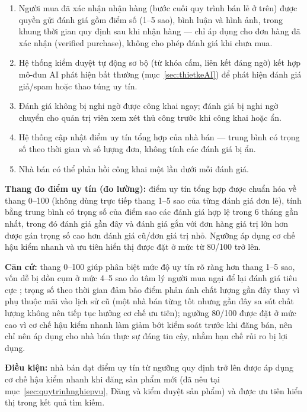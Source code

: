 \begin{enumerate}
    \item Người mua đã xác nhận nhận hàng (bước cuối quy trình bán lẻ ở trên) được quyền gửi đánh giá gồm điểm số (1--5 sao), bình luận và hình ảnh, trong khung thời gian quy định sau khi nhận hàng --- chỉ áp dụng cho đơn hàng đã xác nhận (verified purchase), không cho phép đánh giá khi chưa mua.
    \item Hệ thống kiểm duyệt tự động sơ bộ (từ khóa cấm, liên kết đáng ngờ) kết hợp mô-đun AI phát hiện bất thường (mục~\ref{sec:thietkeAI}) để phát hiện đánh giá giả/spam hoặc thao túng uy tín.
    \item Đánh giá không bị nghi ngờ được công khai ngay; đánh giá bị nghi ngờ chuyển cho quản trị viên xem xét thủ công trước khi công khai hoặc ẩn.
    \item Hệ thống cập nhật điểm uy tín tổng hợp của nhà bán --- trung bình có trọng số theo thời gian và số lượng đơn, không tính các đánh giá bị ẩn.
    \item Nhà bán có thể phản hồi công khai một lần dưới mỗi đánh giá.
\end{enumerate}

\textbf{Thang đo điểm uy tín (đo lường):} điểm uy tín tổng hợp được chuẩn hóa về thang 0--100 (không dùng trực tiếp thang 1--5 sao của từng đánh giá đơn lẻ), tính bằng trung bình có trọng số của điểm sao các đánh giá hợp lệ trong 6 tháng gần nhất, trong đó đánh giá gần đây và đánh giá gắn với đơn hàng giá trị lớn hơn được gán trọng số cao hơn đánh giá cũ/đơn giá trị nhỏ. Ngưỡng áp dụng cơ chế hậu kiểm nhanh và ưu tiên hiển thị được đặt ở mức từ 80/100 trở lên.

\textbf{Căn cứ:} thang 0--100 giúp phân biệt mức độ uy tín rõ ràng hơn thang 1--5 sao, vốn dễ bị dồn cụm ở mức 4--5 sao do tâm lý người mua ngại để lại đánh giá tiêu cực \cite{springer_article}; trọng số theo thời gian đảm bảo điểm phản ánh chất lượng gần đây thay vì phụ thuộc mãi vào lịch sử cũ (một nhà bán từng tốt nhưng gần đây sa sút chất lượng không nên tiếp tục hưởng cơ chế ưu tiên); ngưỡng 80/100 được đặt ở mức cao vì cơ chế hậu kiểm nhanh làm giảm bớt kiểm soát trước khi đăng bán, nên chỉ nên áp dụng cho nhà bán thực sự đáng tin cậy, nhằm hạn chế rủi ro bị lợi dụng.

\textbf{Điều kiện:} nhà bán đạt điểm uy tín từ ngưỡng quy định trở lên được áp dụng cơ chế hậu kiểm nhanh khi đăng sản phẩm mới (đã nêu tại mục~\ref{sec:quytrinhnghiepvu}, Đăng và kiểm duyệt sản phẩm) và được ưu tiên hiển thị trong kết quả tìm kiếm.

